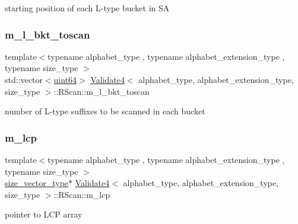starting position of each L-\/type bucket in SA 

\mbox{\label{struct_validate4_1_1_r_scan_a47335f1e738063b9ddc5ee00be052cfd}} 
\subsubsection{\texorpdfstring{m\+\_\+l\+\_\+bkt\+\_\+toscan}{m\_l\_bkt\_toscan}}
{\footnotesize\ttfamily template$<$typename alphabet\+\_\+type , typename alphabet\+\_\+extension\+\_\+type , typename size\+\_\+type $>$ \\
std\+::vector$<$\hyperlink{types_8h_a60e8696a4678cd348e991a1f172e53f7}{uint64}$>$ \hyperlink{class_validate4}{Validate4}$<$ alphabet\+\_\+type, alphabet\+\_\+extension\+\_\+type, size\+\_\+type $>$\+::R\+Scan\+::m\+\_\+l\+\_\+bkt\+\_\+toscan\hspace{0.3cm}{\ttfamily [private]}}



number of L-\/type suffixes to be scanned in each bucket 

\mbox{\label{struct_validate4_1_1_r_scan_a5521d8d0a72b169e07da61abd5463634}} 
\subsubsection{\texorpdfstring{m\+\_\+lcp}{m\_lcp}}
{\footnotesize\ttfamily template$<$typename alphabet\+\_\+type , typename alphabet\+\_\+extension\+\_\+type , typename size\+\_\+type $>$ \\
\hyperlink{class_validate4_a46ea31a0a4b23f583806792160421d15}{size\+\_\+vector\+\_\+type}$\ast$ \hyperlink{class_validate4}{Validate4}$<$ alphabet\+\_\+type, alphabet\+\_\+extension\+\_\+type, size\+\_\+type $>$\+::R\+Scan\+::m\+\_\+lcp\hspace{0.3cm}{\ttfamily [private]}}



pointer to L\+CP array 

\mbox{\label{struct_validate4_1_1_r_scan_a83351c07dee43e836114a49df9a0ec0a}} 
